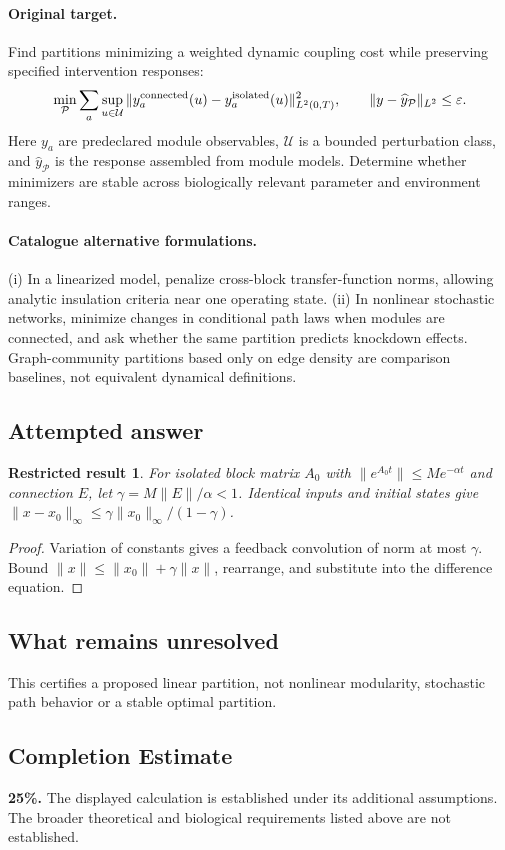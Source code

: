 \documentclass[11pt]{article}
\newtheorem{attemptresult}{Restricted result}[section]
\begin{document}
\paragraph{Original target.}
Find partitions minimizing a weighted dynamic coupling cost while preserving specified intervention responses:
\[\min_{\mathcal P}\sum_a\sup_{u\in\mathcal U}\|y_a^{\rm connected}(u)-y_a^{\rm isolated}(u)\|_{L^2(0,T)}^2,\qquad \|y-\widehat y_{\mathcal P}\|_{L^2}\le\varepsilon.\]
Here $y_a$ are predeclared module observables, $\mathcal U$ is a bounded perturbation class, and $\widehat y_{\mathcal P}$ is the response assembled from module models. Determine whether minimizers are stable across biologically relevant parameter and environment ranges.
\paragraph{Catalogue alternative formulations.}
(i) In a linearized model, penalize cross-block transfer-function norms, allowing analytic insulation criteria near one operating state. (ii) In nonlinear stochastic networks, minimize changes in conditional path laws when modules are connected, and ask whether the same partition predicts knockdown effects. Graph-community partitions based only on edge density are comparison baselines, not equivalent dynamical definitions.
\subsection{Attempted answer}
\begin{attemptresult}
For isolated block matrix $A_0$ with $\|e^{A_0t}\|\leq Me^{-\alpha t}$ and connection $E$, let $\gamma=M\|E\|/\alpha<1$. Identical inputs and initial states give $\|x-x_0\|_\infty\leq\gamma\|x_0\|_\infty/(1-\gamma)$.
\end{attemptresult}
\begin{proof}
Variation of constants gives a feedback convolution of norm at most $\gamma$. Bound $\|x\|\leq\|x_0\|+\gamma\|x\|$, rearrange, and substitute into the difference equation.
\end{proof}
\subsection{What remains unresolved}
This certifies a proposed linear partition, not nonlinear modularity, stochastic path behavior or a stable optimal partition.
\subsection{Completion Estimate}
\textbf{25\%.} The displayed calculation is established under its additional assumptions. The broader theoretical and biological requirements listed above are not established.
\end{document}
